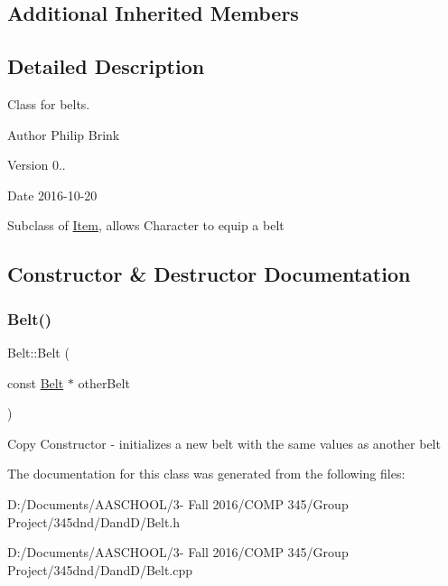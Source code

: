 \subsection*{Additional Inherited Members}


\subsection{Detailed Description}
Class for belts. 

\begin{DoxyAuthor}{Author}
Philip Brink 
\end{DoxyAuthor}
\begin{DoxyVersion}{Version}
0.. 
\end{DoxyVersion}
\begin{DoxyDate}{Date}
2016-\/10-\/20
\end{DoxyDate}
Subclass of \hyperlink{class_item}{Item}, allows Character to equip a belt 

\subsection{Constructor \& Destructor Documentation}
\hypertarget{class_belt_a0fe7148ac3d4fba7953f89cd1ca00443}{}\label{class_belt_a0fe7148ac3d4fba7953f89cd1ca00443} 
\subsubsection{\texorpdfstring{Belt()}{Belt()}}
{\footnotesize\ttfamily Belt\+::\+Belt (\begin{DoxyParamCaption}\item[{const \hyperlink{class_belt}{Belt} $\ast$}]{other\+Belt }\end{DoxyParamCaption})}

Copy Constructor -\/ initializes a new belt with the same values as another belt 

The documentation for this class was generated from the following files\+:\begin{DoxyCompactItemize}
\item 
D\+:/\+Documents/\+A\+A\+S\+C\+H\+O\+O\+L/3-\/ Fall 2016/\+C\+O\+M\+P 345/\+Group Project/345dnd/\+Dand\+D/Belt.\+h\item 
D\+:/\+Documents/\+A\+A\+S\+C\+H\+O\+O\+L/3-\/ Fall 2016/\+C\+O\+M\+P 345/\+Group Project/345dnd/\+Dand\+D/Belt.\+cpp\end{DoxyCompactItemize}
